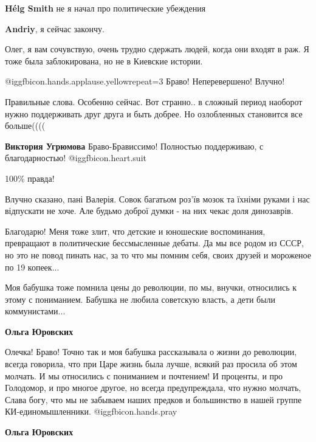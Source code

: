 \begin{itemize}
\begin{itemize}
\textbf{Hélg Smith} не я начал про политические убеждения

\textbf{Andriy}, я сейчас закончу.

Олег, я вам сочувствую, очень трудно сдержать людей, когда они входят в раж. Я
тоже была заблокирована, но не в Киевские истории.
\end{itemize} %

 @igg{fbicon.hands.applause.yellow}{repeat=3}  Браво!
Неперевершено!
Влучно!


Правильные слова. Особенно сейчас. Вот странно.. в сложный период наоборот
нужно поддерживать друг друга и быть добрее. Но озлобленных становится все
больше((((

\textbf{Виктория Угрюмова} Браво-Брависсимо! Полностью поддерживаю, с
благодарностью! @igg{fbicon.heart.suit}

100\% правда!


Влучно сказано, пані Валерія. Совок багатьом роз'їв мозок та їхніми руками і
нас відпускати не хоче. Але будьмо доброї думки - на них чекає доля динозаврів.


Благодарю! Меня тоже злит, что детские и юношеские воспоминания, превращают в
политические бессмысленные дебаты. Да мы все родом из СССР, но это не повод
пинать нас, за то что мы помним себя, своих друзей и мороженое по 19 копеек...

Моя бабушка тоже помнила цены до революции, по мы, внучки, относились к этому с
пониманием. Бабушка не любила советскую власть, а дети были коммунистами...

\begin{itemize} %
\textbf{Ольга Юровских} 

Олечка! Браво! Точно так и моя бабушка рассказывала о жизни до революции, всегда
говорила, что при Царе жизнь была лучше, всякий раз просила об этом молчать. И мы
относились с пониманием и почтением! И проценты, и про Голодомор, и про многое
другое, но всегда предупреждала, что нужно молчать, Слава богу, что мы не забываем
наших предков и большинство в нашей группе КИ-единомышленники. @igg{fbicon.hands.pray} 

\textbf{Ольга Юровских}


\end{itemize}
\end{itemize}
